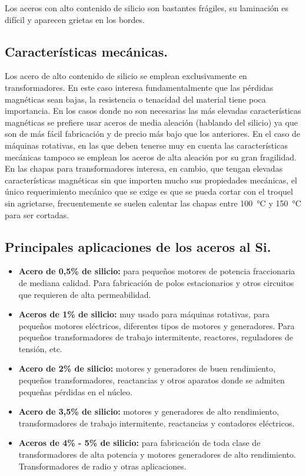 \documentclass[12pt,a4paper]{article}
\begin{document}
Los aceros con alto contenido de silicio son bastantes frágiles, su laminación es difícil y aparecen grietas en los bordes.

\subsection{Características mecánicas.}

Los acero de alto contenido de silicio se emplean exclusivamente en transformadores. En este caso interesa fundamentalmente que las pérdidas magnéticas sean bajas, la resistencia o tenacidad del material tiene poca importancia. En los casos donde no son necesarias las más elevadas características magnéticas se prefiere usar aceros de media aleación (hablando del silicio) ya que son de más fácil fabricación y de precio más bajo que los anteriores. En el caso de máquinas rotativas, en las que deben tenerse muy en cuenta las características mecánicas tampoco se emplean los aceros de alta aleación por su gran fragilidad. En las chapas para transformadores interesa, en cambio, que tengan elevadas características magnéticas sin que importen mucho sus propiedades mecánicas, el único requerimiento mecánico que se exige es que se pueda cortar con el troquel sin agrietarse, frecuentemente se suelen calentar las chapas entre \SI{100}{\celsius} y \SI{150}{\celsius} para ser cortadas.

\subsection{Principales aplicaciones de los aceros al Si.}

\begin{itemize}
    \item \textbf{Acero de 0,5\% de silicio:} para pequeños motores de potencia fraccionaria de mediana calidad. Para fabricación de polos estacionarios y otros circuitos que requieren de alta permeabilidad.
    \item \textbf{Aceros de 1\% de silicio:} muy usado para máquinas rotativas, para pequeños motores eléctricos, diferentes tipos de motores y generadores. Para pequeños transformadores de trabajo intermitente, reactores, reguladores de tensión, etc.
    \item \textbf{Acero de 2\% de silicio:} motores y generadores de buen rendimiento, pequeños transformadores, reactancias y otros aparatos donde se admiten pequeñas pérdidas en el núcleo.
    \item \textbf{Acero de 3,5\% de silicio:} motores y generadores de alto rendimiento, transformadores de trabajo intermitente, reactancias y contadores eléctricos.
    \item \textbf{Aceros de 4\% - 5\% de silicio:} para fabricación de toda clase de transformadores de alta potencia y motores generadores de alto rendimiento. Transformadores de radio y otras aplicaciones.
\end{itemize}
\end{document}
